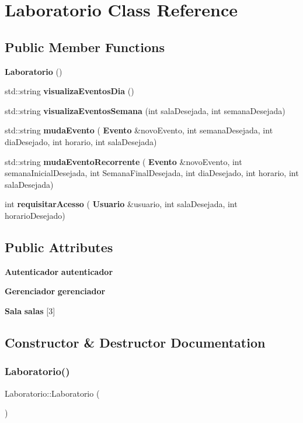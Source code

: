 \section{Laboratorio Class Reference}
\label{class_laboratorio}
\subsection*{Public Member Functions}
\begin{DoxyCompactItemize}
\item 
\textbf{ Laboratorio} ()
\item 
std\+::string \textbf{ visualiza\+Eventos\+Dia} ()
\item 
std\+::string \textbf{ visualiza\+Eventos\+Semana} (int sala\+Desejada, int semana\+Desejada)
\item 
std\+::string \textbf{ muda\+Evento} (\textbf{ Evento} \&novo\+Evento, int semana\+Desejada, int dia\+Desejado, int horario, int sala\+Desejada)
\item 
std\+::string \textbf{ muda\+Evento\+Recorrente} (\textbf{ Evento} \&novo\+Evento, int semana\+Inicial\+Desejada, int Semana\+Final\+Desejada, int dia\+Desejado, int horario, int sala\+Desejada)
\item 
int \textbf{ requisitar\+Acesso} (\textbf{ Usuario} \&usuario, int sala\+Desejada, int horario\+Desejado)
\end{DoxyCompactItemize}
\subsection*{Public Attributes}
\begin{DoxyCompactItemize}
\item 
\textbf{ Autenticador} \textbf{ autenticador}
\item 
\textbf{ Gerenciador} \textbf{ gerenciador}
\item 
\textbf{ Sala} \textbf{ salas} [3]
\end{DoxyCompactItemize}


\subsection{Constructor \& Destructor Documentation}
\mbox{\label{class_laboratorio_a203ae5fbf52d077614e3234456994b02}} 
\subsubsection{Laboratorio()}
{\footnotesize\ttfamily Laboratorio\+::\+Laboratorio (\begin{DoxyParamCaption}{ }\end{DoxyParamCaption})\hspace{0.3cm}{\ttfamily [inline]}}



